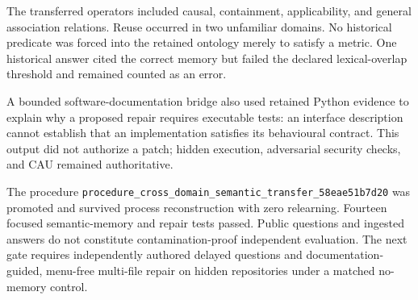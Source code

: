 The transferred operators included causal, containment, applicability, and
general association relations.  Reuse occurred in two unfamiliar domains.  No
historical predicate was forced into the retained ontology merely to satisfy a
metric.  One historical answer cited the correct memory but failed the declared
lexical-overlap threshold and remained counted as an error.

A bounded software-documentation bridge also used retained Python evidence to
explain why a proposed repair requires executable tests: an interface
description cannot establish that an implementation satisfies its behavioural
contract.  This output did not authorize a patch; hidden execution, adversarial
security checks, and CAU remained authoritative.

The procedure
\texttt{procedure\_cross\_domain\_semantic\_transfer\_58eae51b7d20}
was promoted and survived process reconstruction with zero relearning.  Fourteen
focused semantic-memory and repair tests passed.  Public questions and ingested
answers do not constitute contamination-proof independent evaluation.  The
next gate requires independently authored delayed questions and documentation-
guided, menu-free multi-file repair on hidden repositories under a matched
no-memory control.

